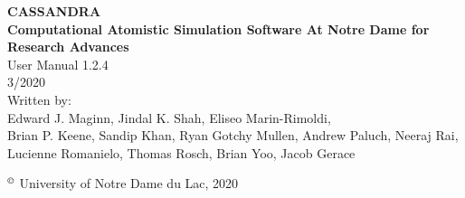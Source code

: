 \begin{center}
\vspace*{2 in}
{\huge{\bf CASSANDRA} }\\
\vspace{0.5in}
{\huge { \bf  Computational Atomistic Simulation Software At Notre Dame for Research Advances}} \\
\vspace{1 in}
User Manual 1.2.4 \\
\vspace{.2 in}
3/2020 \\
\vspace{0.2in}
Written by: \\
\vspace{0.2in}
Edward J. Maginn, Jindal K. Shah, Eliseo Marin-Rimoldi, \\
Brian P. Keene, Sandip Khan, Ryan Gotchy Mullen, Andrew Paluch,
Neeraj Rai, Lucienne Romanielo, Thomas Rosch, Brian Yoo, Jacob Gerace
\end{center}
\vspace{1.0in}
$^\copyright$ University of Notre Dame du Lac, 2020
